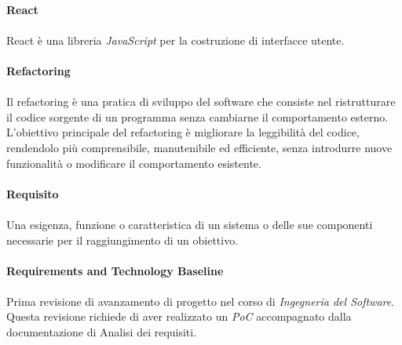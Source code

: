\documentclass[10pt, a4paper]{article}
\begin{document}
\paragraph{React}\noindent\hrulefill
\paragraph{}React è una libreria \textit{JavaScript\pg} per la costruzione di interfacce utente.

\vspace{2em}
\paragraph{Refactoring}\noindent\hrulefill
\paragraph{}Il refactoring è una pratica di sviluppo del software che consiste nel ristrutturare il codice sorgente di un programma senza cambiarne il comportamento esterno. L'obiettivo principale del refactoring è migliorare la leggibilità del codice, rendendolo più comprensibile, manutenibile ed efficiente, senza introdurre nuove funzionalità o modificare il comportamento esistente.


\vspace{2em}
\paragraph{Requisito}\noindent\hrulefill
\paragraph{}Una esigenza, funzione o caratteristica di un sistema o delle sue componenti necessarie per il raggiungimento di un obiettivo. 


\vspace{2em}
\paragraph{Requirements and Technology Baseline}\noindent\hrulefill
\paragraph{}Prima revisione di avanzamento di progetto nel corso di \textit{Ingegneria del Software\pg}. Questa revisione richiede di aver realizzato un \textit{PoC\pg} accompagnato dalla documentazione di Analisi dei requisiti.
\end{document}
